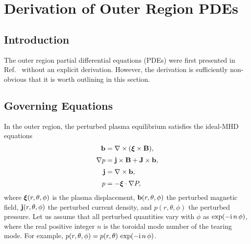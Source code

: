 \documentclass[12pt,prb,aps]{revtex4-1}
\newcommand {\bxi}{\mbox{\boldmath$\xi$}}
\begin{document}
\section{Derivation of Outer Region PDEs}
\subsection{Introduction}
The outer region partial differential equations (PDEs) were first presented in Ref.~ without an explicit
derivation. However, the derivation is sufficiently non-obvious that it is worth outlining in this section. 

\subsection{Governing Equations}\label{mhd}
In the outer region, the perturbed plasma equilibrium satisfies the  ideal-MHD equations\,\cite{connor,am1,am3,gs1}
\begin{align}
{\bf b} &= \nabla\times (\bxi\times {\bf B}),\label{e21}\\[0.5ex]
\nabla p &={\bf j}\times {\bf B}  +{\bf J}\times {\bf b},\label{e22}\\[0.5ex]
{\bf j} &= \nabla\times {\bf b},\label{e23}\\[0.5ex]
p&= -\bxi\cdot\nabla P,\label{e24}
\end{align}
where $\bxi(r,\theta,\phi)$ is the plasma displacement, ${\bf b}(r,\theta,\phi)$ the perturbed magnetic field,
${\bf j}(r,\theta,\phi)$ the perturbed current density, and $p(r,\theta,\phi)$ the perturbed pressure. 
Let us assume that all perturbed quantities vary with $\phi$ as $\exp(-{\rm i}\,n\,\phi)$, where the real positive integer $n$ is the
toroidal mode number of the tearing mode. For example, $p(r,\theta,\phi) = p(r,\theta)\,\exp(-{\rm i}\,n\,\phi)$. 
\end{document}
